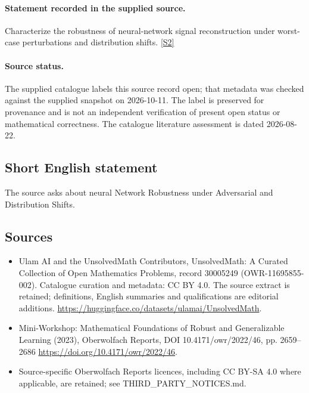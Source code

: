 \documentclass[11pt]{article}
\begin{document}
\paragraph{Statement recorded in the supplied source.}
Characterize the robustness of neural-network signal reconstruction under worst-case perturbations and distribution shifts. \href{https://doi.org/10.4171/owr/2022/46}{[S2]}
\paragraph{Source status.}
The supplied catalogue labels this source record open; that metadata was checked against the supplied snapshot on 2026-10-11. The label is preserved for provenance and is not an independent verification of present open status or mathematical correctness. The catalogue literature assessment is dated 2026-08-22.
\subsection{Short English statement}
The source asks about neural Network Robustness under Adversarial and Distribution Shifts.
\subsection{Sources}
\begin{itemize}
\item[S1] Ulam AI and the UnsolvedMath Contributors, UnsolvedMath: A Curated Collection of Open Mathematics Problems, record 30005249 (OWR-11695855-002). Catalogue curation and metadata: CC BY 4.0. The source extract is retained; definitions, English summaries and qualifications are editorial additions.
\url{https://huggingface.co/datasets/ulamai/UnsolvedMath}.
\item[S2] Mini-Workshop: Mathematical Foundations of Robust and Generalizable Learning (2023), Oberwolfach Reports, DOI 10.4171/owr/2022/46, pp. 2659--2686
\url{https://doi.org/10.4171/owr/2022/46}.
\item Source-specific Oberwolfach Reports licences, including CC BY-SA 4.0 where applicable, are retained; see THIRD\_PARTY\_NOTICES.md.
\end{itemize}
\end{document}
